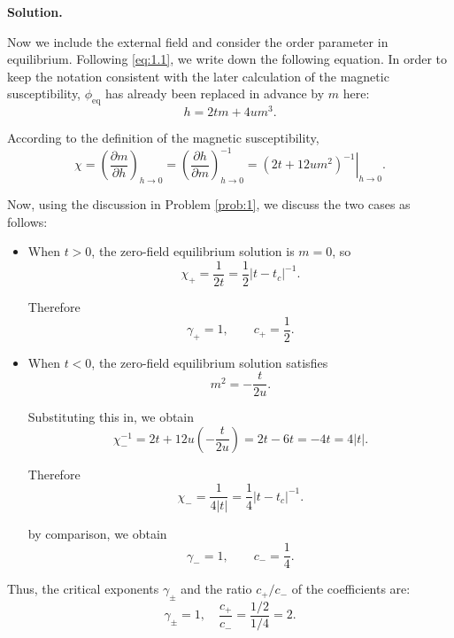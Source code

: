 \documentclass[11pt,a4paper]{article}
\newcounter{problem}
\newcounter{saveequation}
\newenvironment{solution}
{
	\par
	\setcounter{saveequation}{\value{equation}}
	\begingroup
	\setcounter{equation}{0}
	\renewcommand{\theequation}{\arabic{problem}.\arabic{equation}}
	\renewcommand{\theHequation}{sol.\arabic{problem}.\arabic{equation}}
	\noindent\textbf{Solution.}\quad
}
{
	\par
	\endgroup
	\setcounter{equation}{\value{saveequation}}
}
\begin{document}
	\begin{solution}
		Now we include the external field and consider the order parameter in equilibrium. Following \eqref{eq:1.1}, we write down the following equation. In order to keep the notation consistent with the later calculation of the magnetic susceptibility, $\phi_{\mathrm{eq}}$ has already been replaced in advance by $m$ here:
		\begin{equation}
			\label{eq:4.1}
			h=2tm+4um^3.
		\end{equation}
		
		According to the definition of the magnetic susceptibility,
		\begin{equation}
			\chi=\left(\frac{\partial m}{\partial h}\right)_{h\to 0}
			=\left(\frac{\partial h}{\partial m}\right)^{-1}_{h\to 0}
			=\left.\left(2t+12um^2\right)^{-1}\right|_{h\to 0}.
		\end{equation}
		
		Now, using the discussion in Problem \ref{prob:1}, we discuss the two cases as follows:
		\begin{itemize}
			\item When $t>0$, the zero-field equilibrium solution is $m=0$, so
			\begin{equation}
				\chi_{+}=\frac{1}{2t}=\frac{1}{2}|t-t_c|^{-1}.
			\end{equation}
			
			Therefore
			\begin{equation}
				\gamma_{+}=1,\qquad c_{+}=\frac{1}{2}.
			\end{equation}
			
			\item When $t<0$, the zero-field equilibrium solution satisfies
			\begin{equation}
				m^2=-\frac{t}{2u}.
			\end{equation}
			
			Substituting this in, we obtain
			\begin{equation}
				\chi_{-}^{-1}=2t+12u\left(-\frac{t}{2u}\right)=2t-6t=-4t=4|t|.
			\end{equation}
			
			Therefore
			\begin{equation}
				\chi_{-}=\frac{1}{4|t|}=\frac{1}{4}|t-t_c|^{-1}.
			\end{equation}
			
			by comparison, we obtain
			\begin{equation}
				\gamma_{-}=1,\qquad c_{-}=\frac{1}{4}.
			\end{equation}
		\end{itemize}
		\begin{finalanswer}
			Thus, the critical exponents $\gamma_{\pm}$ and the ratio ${c_{+}}/{c_{-}}$ of the coefficients are:
			\begin{equation}
				\label{fin:4}
				\gamma_\pm =1,\quad \frac{c_{+}}{c_{-}}=\frac{1/2}{1/4}=2.
			\end{equation}
		\end{finalanswer}
	\end{solution}
	
\end{document}
